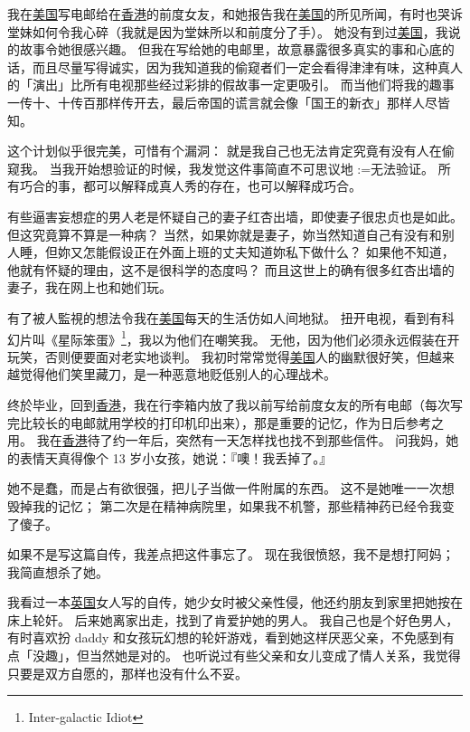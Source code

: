 \documentclass[12pt]{report}
\makeatletter
\renewcommand{\d}[1]{$\underaccent{\scalebox{0.5}{\textbullet}}{\textrm{#1}}$}
\newcommand{\ds}[1]{%
  \@tfor\next:=#1\do{\d{\next}}}
\makeatother
\begin{document}
{我在\uline{美国}写电邮给在\uline{香港}的前度女友，和她报告我在\uline{美国}的所见所闻，有时也哭诉堂妹如何令我心碎（我就是因为堂妹所以和前度分了手）。  她没有到过\uline{美国}，我说的故事令她很感兴趣。  但我在写给她的电邮里，故意暴露很多真实的事和心底的话，而且尽量写得诚实，因为我知道我的偷窥者们一定会看得津津有味，这种真人的「演出」比所有电视那些经过彩排的假故事一定更吸引。  而当他们将我的趣事一传十、十传百那样传开去，最后帝国的谎言就会像「国王的新衣」那样人尽皆知。

这个计划似乎很完美，可惜有个漏洞： 就是我自己也无法肯定究竟有没有人在偷窥我。 当我开始想验证的时候，我发觉这件事简直不可思议地\ds{无法验证}。  所有巧合的事，都可以解释成真人秀的存在，也可以解释成巧合。

有些逼害妄想症的男人老是怀疑自己的妻子红杏出墙，即使妻子很忠贞也是如此。 但这究竟算不算是一种病？ 当然，如果妳就是妻子，妳当然知道自己有没有和别人睡，但妳又怎能假设正在外面上班的丈夫知道妳私下做什么？  如果他不知道，他就有怀疑的理由，这不是很科学的态度吗？  而且这世上的确有很多红杏出墙的妻子，我在网上也和她们玩。

有了被人監視的想法令我在\uline{美国}每天的生活仿如人间地狱。  扭开电视，看到有科幻片叫《星际笨蛋》\footnote{Inter-galactic Idiot}，我以为他们在嘲笑我。  无他，因为他们必须永远假装在开玩笑，否则便要面对老实地谈判。  我初时常常觉得\uline{美国}人的幽默很好笑，但越来越觉得他们笑里藏刀，是一种恶意地贬低别人的心理战术。

终於毕业，回到\uline{香港}，我在行李箱内放了我以前写给前度女友的所有电邮（每次写完比较长的电邮就用学校的打印机印出来），那是重要的记忆，作为日后参考之用。 我在\uline{香港}待了约一年后，突然有一天怎样找也找不到那些信件。 问我妈，她的表情天真得像个 13 岁小女孩，她说：『噢！我丢掉了。』

她不是蠢，而是占有欲很强，把儿子当做一件附属的东西。  这不是她唯一一次想毁掉我的记忆； 第二次是在精神病院里，如果我不机警，那些精神药已经令我变了傻子。

如果不是写这篇自传，我差点把这件事忘了。  现在我很愤怒，我不是想打阿妈； 我简直想杀了她。 

我看过一本\uline{英国}女人写的自传，她少女时被父亲性侵，他还约朋友到家里把她按在床上轮奸。 后来她离家出走，找到了肯爱护她的男人。 我自己也是个好色男人，有时喜欢扮 daddy 和女孩玩幻想的轮奸游戏，看到她这样厌恶父亲，不免感到有点「没趣」，但当然她是对的。  也听说过有些父亲和女儿变成了情人关系，我觉得只要是双方自愿的，那样也没有什么不妥。

}
\end{document}
